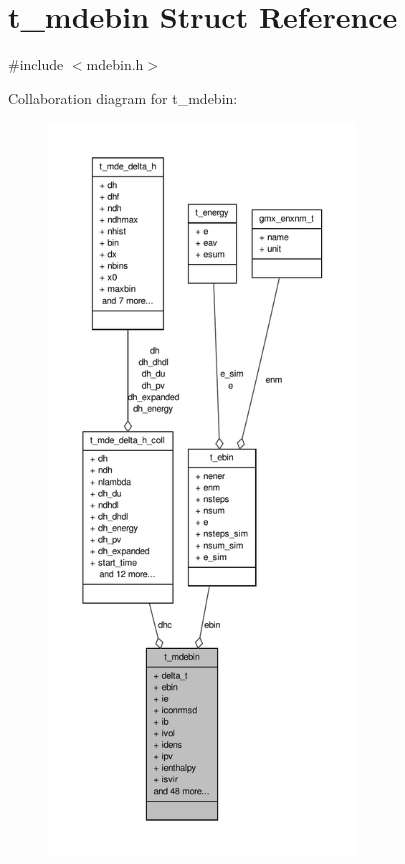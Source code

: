 \hypertarget{structt__mdebin}{\section{t\-\_\-mdebin \-Struct \-Reference}
\label{structt__mdebin}
}


{\ttfamily \#include $<$mdebin.\-h$>$}



\-Collaboration diagram for t\-\_\-mdebin\-:
\nopagebreak
\begin{figure}[H]
\begin{center}
\leavevmode
\includegraphics[height=550pt]{structt__mdebin__coll__graph}
\end{center}
\end{figure}
